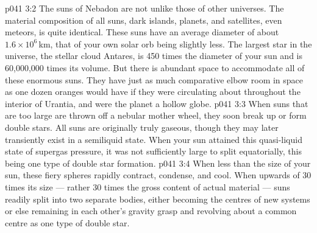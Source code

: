 \vs p041 3:2 The suns of Nebadon are not unlike those of other universes. The material composition of all suns, dark islands, planets, and satellites, even meteors, is quite identical. These suns have an average diameter of about $1.6\times 10^6$\,km, that of your own solar orb being slightly less. The largest star in the universe, the stellar cloud Antares, is 450 times the diameter of your sun and is 60,000,000 times its volume. But there is abundant space to accommodate all of these enormous suns. They have just as much comparative elbow room in space as one dozen oranges would have if they were circulating about throughout the interior of Urantia, and were the planet a hollow globe.
\vs p041 3:3 \pc When suns that are too large are thrown off a nebular mother wheel, they soon break up or form double stars. All suns are originally truly gaseous, though they may later transiently exist in a semiliquid state. When your sun attained this quasi\hyp{}liquid state of supergas pressure, it was not sufficiently large to split equatorially, this being one type of double star formation.
\vs p041 3:4 When less than  the size of your sun, these fiery spheres rapidly contract, condense, and cool. When upwards of 30 times its size --- rather 30 times the gross content of actual material --- suns readily split into two separate bodies, either becoming the centres of new systems or else remaining in each other’s gravity grasp and revolving about a common centre as one type of double star.
